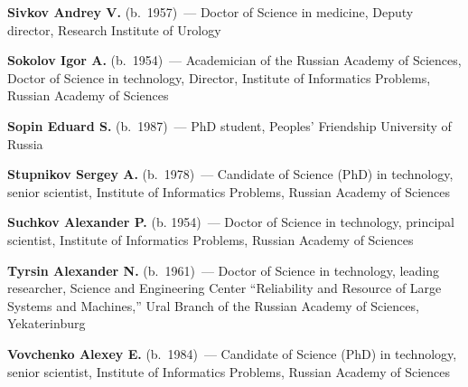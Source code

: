 \begin{multicols}{2}
\vspace*{3pt}

\noindent
\textbf{Sivkov Andrey V.} (b.\ 1957)~--- Doctor of Science in medicine, Deputy director, 
Research Institute of Urology 

\vspace*{3pt}

\noindent
\textbf{Sokolov Igor A.} (b.\ 1954)~--- Academician of the Russian Academy of Sciences, 
Doctor of Science in technology, Director, Institute of Informatics Problems, 
Russian Academy of Sciences 

\vspace*{3pt}

\noindent \textbf{Sopin Eduard S.} (b.\ 1987)~--- PhD student, Peoples' 
Friendship University of Russia

\vspace*{3pt}

\noindent
\textbf{Stupnikov Sergey A.} (b.\ 1978)~--- Candidate of Science (PhD) in technology, 
senior scientist, Institute of Informatics Problems, Russian Academy of Sciences

\vspace*{3pt}


\noindent
\textbf{Suchkov Alexander P.} (b. 1954)~--- Doctor of Science in technology, principal 
scientist, Institute of Informatics Problems, Russian Academy of Sciences 



\columnbreak




\vspace*{3pt}

\noindent
\textbf{Tyrsin Alexander N.} (b.\ 1961)~--- Doctor of Science in technology, leading 
researcher, Science and Engineering Center ``Reliability and Resource of Large 
Systems and Machines,'' Ural Branch of the Russian Academy of Sciences, 
Yekaterinburg

\vspace*{3pt}

\noindent
\textbf{Vovchenko Alexey E.} (b.\ 1984)~--- Candidate of Science (PhD) in technology, 
senior scientist, Institute of Informatics Problems, Russian Academy of Sciences


\end{multicols}
